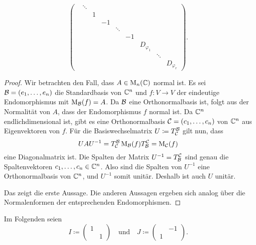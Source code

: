 \documentclass[a4paper,10pt]{scrartcl}
\begin{document}
\begin{theorem}
\begin{enumerate}[leftmargin=*]
\[\begin{pmatrix}
            & \ddots  &   &     &         &     &               &         &                 \\
            &         & 1 &     &         &     &               &         &                 \\
            &         &   & -1  &         &     &               &         &                 \\
            &         &   &     & \ddots  &     &               &         &                 \\
            &         &   &     &         & -1  &               &         &                 \\
            &         &   &     &         &     & D_{\varphi_1} &         &                 \\
            &         &   &     &         &     &               & \ddots  &                 \\
            &         &   &     &         &     &               &         & D_{\varphi_r}
        \end{pmatrix}.
      \]
  \end{enumerate}
\end{theorem}


\begin{proof}
  Wir betrachten den Fall, dass $A \in \operatorname{M}_n(\mathbb{C})$ normal ist.
  Es sei $\mathcal{B} = (e_1, \dotsc, e_n)$ die Standardbasis von $\mathbb{C}^n$ und $f \colon V \to V$ der eindeutige Endomorphismus mit $\operatorname{M}_{\mathcal{B}}(f) = A$.
  Da $\mathcal{B}$ eine Orthonormalbasis ist, folgt aus der Normalität von $A$, dass der Endomorphismus $f$ normal ist.
  Da $\mathbb{C}^n$ endlichdimensional ist, gibt es eine Orthonormalbasis $\mathcal{C} = (c_1, \dotsc, c_n)$ von $\mathbb{C}^n$ aus Eigenvektoren von $f$.
  Für die Basiswechselmatrix $U \coloneqq T^{\mathcal{B}}_{\mathcal{C}}$ gilt nun, dass
  \[
      U A U^{-1}
    = T^{\mathcal{B}}_{\mathcal{C}} \operatorname{M}_{\mathcal{B}}(f) T^{\mathcal{C}}_{\mathcal{B}}
    = \operatorname{M}_{\mathcal{C}}(f)
  \]
  eine Diagonalmatrix ist.
  Die Spalten der Matrix $U^{-1} = T^{\mathcal{C}}_{\mathcal{B}}$ sind genau die Spaltenvektoren $c_1, \dotsc, c_n \in \mathbb{C}^n$.
  Also sind die Spalten von $U^{-1}$ eine Orthonormalbasis von $\mathbb{C}^n$, und $U^{-1}$ somit unitär.
  Deshalb ist auch $U$ unitär.
  
  Das zeigt die erste Aussage.
  Die anderen Aussagen ergeben sich analog über die Normalenformen der entsprechenden Endomorphismen.
\end{proof}


Im Folgenden seien
\[
  I \coloneqq
  \begin{pmatrix}
    1 &   \\
      & 1
  \end{pmatrix}
  \quad\text{und}\quad
  J \coloneqq
  \begin{pmatrix}
      & -1  \\
    1 & 
  \end{pmatrix}.
\]
\end{document}
